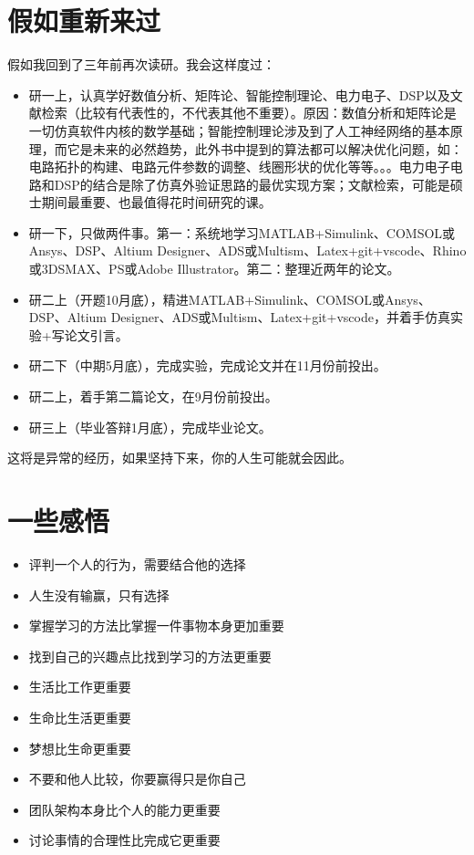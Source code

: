 \documentclass[UTF8,oneside]{ctexbook}
\begin{document}
\section{假如重新来过}
假如我回到了三年前再次读研。我会这样度过：
\begin{itemize}
	\item 研一上，认真学好数值分析、矩阵论、智能控制理论、电力电子、DSP以及文献检索（比较有代表性的，不代表其他不重要）。原因：数值分析和矩阵论是一切仿真软件内核的数学基础；智能控制理论涉及到了人工神经网络的基本原理，而它是未来的必然趋势，此外书中提到的算法都可以解决优化问题，如：电路拓扑的构建、电路元件参数的调整、线圈形状的优化等等。。。电力电子电路和DSP的结合是除了仿真外验证思路的最优实现方案；文献检索，可能是硕士期间最重要、也最值得花时间研究的课。
	\item 研一下，只做两件事。第一：系统地学习MATLAB+Simulink、COMSOL或Ansys、DSP、Altium Designer、ADS或Multism、Latex+git+vscode、Rhino或3DSMAX、PS或Adobe Illustrator。第二：整理近两年的论文。
	\item 研二上（开题10月底），精进MATLAB+Simulink、COMSOL或Ansys、DSP、Altium Designer、ADS或Multism、Latex+git+vscode，并着手仿真实验+写论文引言。
	\item 研二下（中期5月底），完成实验，完成论文并在11月份前投出。
	\item 研二上，着手第二篇论文，在9月份前投出。
	\item 研三上（毕业答辩1月底），完成毕业论文。
\end{itemize}

这将是异常的经历，如果坚持下来，你的人生可能就会因此。

\section{一些感悟}
\begin{itemize}
	\item 评判一个人的行为，需要结合他的选择
	\item 人生没有输赢，只有选择
	\item 掌握学习的方法比掌握一件事物本身更加重要
	\item 找到自己的兴趣点比找到学习的方法更重要
	\item 生活比工作更重要
	\item 生命比生活更重要
	\item 梦想比生命更重要
	\item 不要和他人比较，你要赢得只是你自己
	\item 团队架构本身比个人的能力更重要
	\item 讨论事情的合理性比完成它更重要
\end{itemize}
\end{document}

